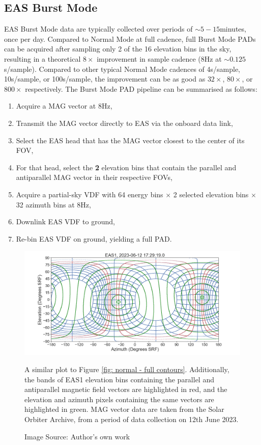 \newpage
\subsection{EAS Burst Mode} \label{EAS Burst Mode}

EAS Burst Mode data are typically collected over periods of \(\sim5-15\)minutes, once per day. Compared to Normal Mode at full cadence, full Burst Mode PADs can be acquired after sampling only 2 of the 16 elevation bins in the sky, resulting in a theoretical \(8\times\) improvement in sample cadence (8Hz at \(\sim0.125\)s/sample). Compared to other typical Normal Mode cadences of 4s/sample, 10s/sample, or 100s/sample, the improvement can be as good as \(32\times\), \(80\times\), or \(800\times\) respectively. The Burst Mode PAD pipeline can be summarised as follows\cite{owen2021}:

\begin{enumerate}
    \item Acquire a MAG vector at 8Hz,
    \item Transmit the MAG vector directly to EAS via the onboard  data link,
    \item Select the EAS head that has the MAG vector closest to the center of its FOV,
    \item For that head, select the \textbf{2} elevation bins that contain the parallel and antiparallel MAG vector in their respective FOVs,
    \item Acquire a partial-sky VDF with 64 energy bins \(\times\) 2 selected elevation bins \(\times\) 32 azimuth bins at 8Hz,
    \item Downlink EAS VDF to ground,
    \item Re-bin EAS VDF on ground, yielding a full PAD.
\end{enumerate}

\begin{figure}
    \centering
    \centerfloat
    \includegraphics[width=1.2\linewidth]{figures/fullcontours_justeas_yesselection.png}
    \caption{A similar plot to Figure \ref{fig: normal - full contours}. Additionally, the bands of EAS1 elevation bins containing the parallel and antiparallel magnetic field vectors are highlighted in red, and the elevation and azimuth pixels containing the same vectors are highlighted in green. MAG vector data are taken from the Solar Orbiter Archive, from a period of data collection on 12th June 2023. }
    \caption*{Image Source: Author's own work}
    \label{fig: normal - full contours + selection}
\end{figure}

